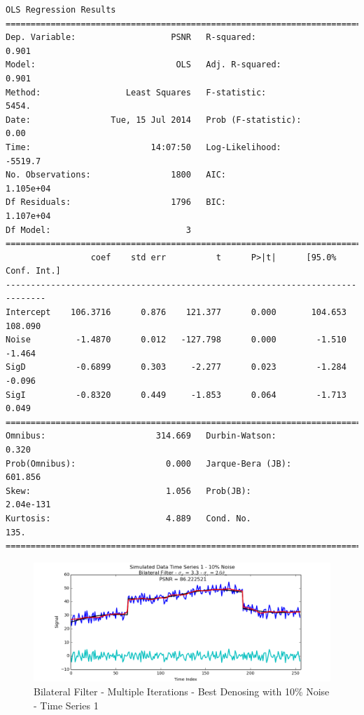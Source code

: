 \documentclass[11pt]{article}
\theoremstyle{definition}
\begin{document}
{\begin{lstlisting}[caption = Time Series 3 - Bilateral Filter Multiple Iterations OLS Model, label = {itrsamebilateral3}]
                            OLS Regression Results                            
==============================================================================
Dep. Variable:                   PSNR   R-squared:                       0.901
Model:                            OLS   Adj. R-squared:                  0.901
Method:                 Least Squares   F-statistic:                     5454.
Date:                Tue, 15 Jul 2014   Prob (F-statistic):               0.00
Time:                        14:07:50   Log-Likelihood:                -5519.7
No. Observations:                1800   AIC:                         1.105e+04
Df Residuals:                    1796   BIC:                         1.107e+04
Df Model:                           3                                         
==============================================================================
                 coef    std err          t      P>|t|      [95.0% Conf. Int.]
------------------------------------------------------------------------------
Intercept    106.3716      0.876    121.377      0.000       104.653   108.090
Noise         -1.4870      0.012   -127.798      0.000        -1.510    -1.464
SigD          -0.6899      0.303     -2.277      0.023        -1.284    -0.096
SigI          -0.8320      0.449     -1.853      0.064        -1.713     0.049
==============================================================================
Omnibus:                      314.669   Durbin-Watson:                   0.320
Prob(Omnibus):                  0.000   Jarque-Bera (JB):              601.856
Skew:                           1.056   Prob(JB):                    2.04e-131
Kurtosis:                       4.889   Cond. No.                         135.
==============================================================================
\end{lstlisting}
}

\begin{figure}
\centering
\includegraphics[width = 0.75 \textwidth]{ItrSameBilateralSignal1Best.png}
\caption{Bilateral Filter - Multiple Iterations - Best Denosing with 10\% Noise - Time Series 1}
\label{itrsamebilateral1best}
\end{figure}
\end{document}
